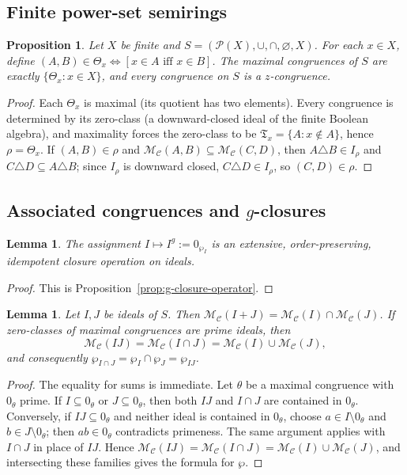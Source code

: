 \documentclass[11pt,leqno]{amsart}
\theoremstyle{plain}
\newtheorem{proposition}[theorem]{Proposition}
\newtheorem{lemma}[theorem]{Lemma}
\theoremstyle{definition}
\theoremstyle{remark}
\numberwithin{equation}{section}
\newcommand{\MC}{\mathcal M_{\mathcal C}}
\begin{document}
\subsection{Finite power-set semirings}

\begin{proposition}\label{app:powerset-expanded}
Let $X$ be finite and $S=(\mathcal{P}(X),\cup,\cap,\varnothing,X)$.
For each $x\in X$, define
$(A,B)\in\Theta_x\Leftrightarrow[x\in A\text{ iff }x\in B]$.
The maximal congruences of $S$ are exactly $\{\Theta_x:x\in X\}$,
and every congruence on $S$ is a $z$-congruence.
\end{proposition}
\begin{proof}
Each $\Theta_x$ is maximal (its quotient has two elements).
Every congruence is determined by its zero-class (a downward-closed
ideal of the finite Boolean algebra), and maximality forces the
zero-class to be $\mathfrak{T}_x=\{A:x\notin A\}$,
hence $\rho=\Theta_x$.
If $(A,B)\in\rho$ and $\MC(A,B)\subseteq\MC(C,D)$,
then $A\triangle B\in I_\rho$ and $C\triangle D\subseteq A\triangle B$;
since $I_\rho$ is downward closed, $C\triangle D\in I_\rho$,
so $(C,D)\in\rho$.
\end{proof}

\subsection{Associated congruences and \texorpdfstring{$g$}{g}-closures}

\begin{lemma}\label{app:g-closure-operator}
The assignment $I\mapsto I^g:=0_{\wp_I}$ is an extensive,
order-preserving, idempotent closure operation on ideals.
\end{lemma}
\begin{proof}
This is Proposition~\ref{prop:g-closure-operator}.
\end{proof}

\begin{lemma}\label{app:MC-product-prime-zero}
Let $I,J$ be ideals of $S$.  Then $\MC(I+J)=\MC(I)\cap\MC(J)$.
If zero-classes of maximal congruences are prime ideals, then
\[
\MC(IJ)=\MC(I\cap J)=\MC(I)\cup\MC(J),
\]
and consequently $\wp_{I\cap J}=\wp_I\cap\wp_J=\wp_{IJ}$.
\end{lemma}
\begin{proof}
The equality for sums is immediate.
Let $\theta$ be a maximal congruence with $0_\theta$ prime.
If $I\subseteq0_\theta$ or $J\subseteq0_\theta$,
then both $IJ$ and $I\cap J$ are contained in $0_\theta$.
Conversely, if $IJ\subseteq0_\theta$ and neither ideal is contained
in $0_\theta$, choose $a\in I\setminus0_\theta$ and
$b\in J\setminus0_\theta$;
then $ab\in0_\theta$ contradicts primeness.
The same argument applies with $I\cap J$ in place of $IJ$.
Hence $\MC(IJ)=\MC(I\cap J)=\MC(I)\cup\MC(J)$,
and intersecting these families gives the formula for $\wp$.
\end{proof}
\end{document}
